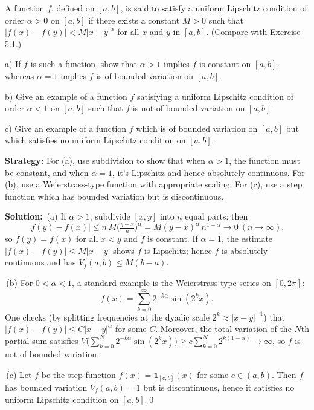 \begin{problembox}
\begin{problemstatement}
A function $f$, defined on $[a, b]$, is said to satisfy a uniform Lipschitz condition of order $\alpha > 0$ on $[a, b]$ if there exists a constant $M > 0$ such that $|f(x) - f(y)| < M |x - y|^\alpha$ for all $x$ and $y$ in $[a, b]$. (Compare with Exercise 5.1.)

a) If $f$ is such a function, show that $\alpha > 1$ implies $f$ is constant on $[a, b]$, whereas $\alpha = 1$ implies $f$ is of bounded variation on $[a, b]$.

b) Give an example of a function $f$ satisfying a uniform Lipschitz condition of order $\alpha < 1$ on $[a, b]$ such that $f$ is not of bounded variation on $[a, b]$.

c) Give an example of a function $f$ which is of bounded variation on $[a, b]$ but which satisfies no uniform Lipschitz condition on $[a, b]$.
\end{problemstatement}
\end{problembox}

\noindent\textbf{Strategy:} For (a), use subdivision to show that when $\alpha > 1$, the function must be constant, and when $\alpha = 1$, it's Lipschitz and hence absolutely continuous. For (b), use a Weierstrass-type function with appropriate scaling. For (c), use a step function which has bounded variation but is discontinuous.

\bigskip\noindent\textbf{Solution:}
\,(a) If $\alpha>1$, subdivide $[x,y]$ into $n$ equal parts: then
\[|f(y)-f(x)|\le n\,M\Big(\tfrac{y-x}{n}\Big)^{\!\alpha}=M(y-x)^{\alpha}\,n^{1-\alpha}\to 0\ (n\to\infty),\]
so $f(y)=f(x)$ for all $x<y$ and $f$ is constant. If $\alpha=1$, the estimate $|f(x)-f(y)|\le M|x-y|$ shows $f$ is Lipschitz; hence $f$ is absolutely continuous and has $V_f(a,b)\le M(b-a)$.

\,(b) For $0<\alpha<1$, a standard example is the Weierstrass-type series on $[0,2\pi]$:
\[f(x)=\sum_{k=0}^{\infty}2^{-k\alpha}\sin(2^k x).\]
One checks (by splitting frequencies at the dyadic scale $2^k\approx |x-y|^{-1}$) that $|f(x)-f(y)|\le C|x-y|^{\alpha}$ for some $C$. Moreover, the total variation of the $N$th partial sum satisfies $V\big(\sum_{k=0}^N2^{-k\alpha}\sin(2^k x)\big)\ge c\sum_{k=0}^N2^{k(1-\alpha)}\to\infty$, so $f$ is not of bounded variation.

\,(c) Let $f$ be the step function $f(x)=\mathbf{1}_{[c,b]}(x)$ for some $c\in(a,b)$. Then $f$ has bounded variation $V_f(a,b)=1$ but is discontinuous, hence it satisfies no uniform Lipschitz condition on $[a,b]$.\qed


